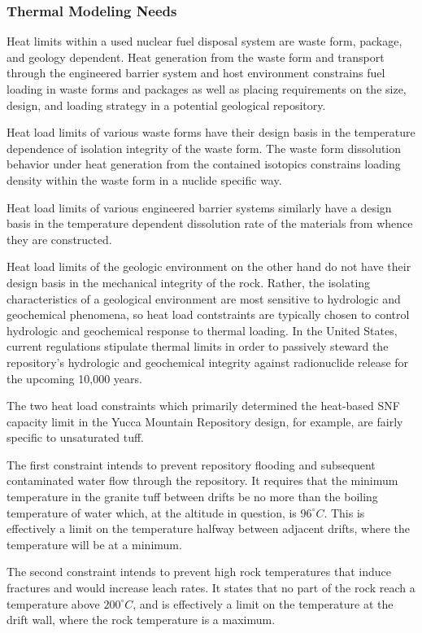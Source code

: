 \subsubsection{Thermal Modeling Needs}

Heat limits within a used nuclear fuel disposal system are waste form, 
package, and geology dependent. Heat generation from the waste form 
and transport through the engineered barrier system and host 
environment constrains fuel loading in waste forms and packages as 
well as placing requirements on the size, design, and loading strategy 
in a potential geological repository.

Heat load limits of various waste forms have their design basis in the 
temperature dependence of isolation integrity of the waste form. The 
waste form dissolution behavior under heat generation from the 
contained isotopics constrains loading density within the waste form 
in a nuclide specific way.  

Heat load limits of various engineered barrier systems similarly have 
a design basis in the temperature dependent dissolution rate of the 
materials from whence they are constructed.  

Heat load limits of the geologic environment on the other hand do not  
have their design basis in the mechanical integrity of the rock.  
Rather, the isolating characteristics of a geological environment are 
most sensitive to hydrologic and geochemical phenomena, so heat load 
contstraints are typically chosen to control hydrologic and 
geochemical response to thermal loading. In the United States, current 
regulations stipulate thermal limits in order to passively steward the 
repository's hydrologic and geochemical integrity against radionuclide  
release for the upcoming 10,000 years.

The two heat load constraints which primarily determined the 
heat-based SNF capacity limit in the Yucca Mountain Repository design, 
for example, are fairly specific to unsaturated tuff. 

The first constraint intends to prevent repository flooding and 
subsequent contaminated water flow through the repository. It requires 
that the minimum temperature in the granite tuff between drifts be no 
more than the boiling temperature of water which, at the altitude in 
question, is $96^{\circ}C$. This is effectively a limit on the 
temperature halfway between adjacent drifts, where the temperature 
will be at a minimum.

The second constraint intends to prevent high rock temperatures that 
induce fractures and would increase leach rates. It states that no 
part of the rock reach a temperature above $200^{\circ}C$, and is 
effectively a limit on the temperature at the drift wall, where the 
rock temperature is a maximum.  

